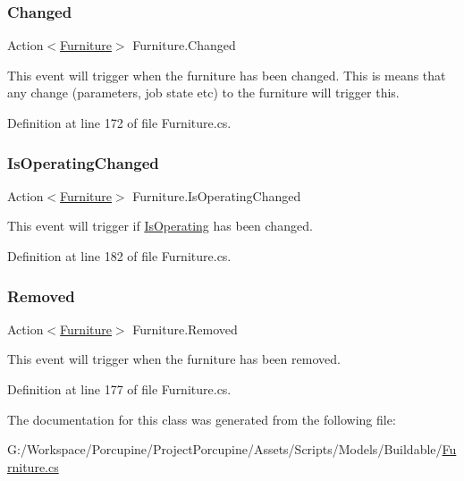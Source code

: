 \subsubsection{\texorpdfstring{Changed}{Changed}}
{\footnotesize\ttfamily Action$<$\hyperlink{class_furniture}{Furniture}$>$ Furniture.\+Changed}



This event will trigger when the furniture has been changed. This is means that any change (parameters, job state etc) to the furniture will trigger this. 



Definition at line 172 of file Furniture.\+cs.

\mbox{\label{class_furniture_a29f6e5c52a936590518b4a5f281ea26e}} 
\subsubsection{\texorpdfstring{Is\+Operating\+Changed}{IsOperatingChanged}}
{\footnotesize\ttfamily Action$<$\hyperlink{class_furniture}{Furniture}$>$ Furniture.\+Is\+Operating\+Changed}



This event will trigger if \hyperlink{class_furniture_addc32913065ddd0ee4660b2de3f84a42}{Is\+Operating} has been changed. 



Definition at line 182 of file Furniture.\+cs.

\mbox{\label{class_furniture_a253700b462c0e22ade21918a314cab76}} 
\subsubsection{\texorpdfstring{Removed}{Removed}}
{\footnotesize\ttfamily Action$<$\hyperlink{class_furniture}{Furniture}$>$ Furniture.\+Removed}



This event will trigger when the furniture has been removed. 



Definition at line 177 of file Furniture.\+cs.



The documentation for this class was generated from the following file\+:\begin{DoxyCompactItemize}
\item 
G\+:/\+Workspace/\+Porcupine/\+Project\+Porcupine/\+Assets/\+Scripts/\+Models/\+Buildable/\hyperlink{_furniture_8cs}{Furniture.\+cs}\end{DoxyCompactItemize}
